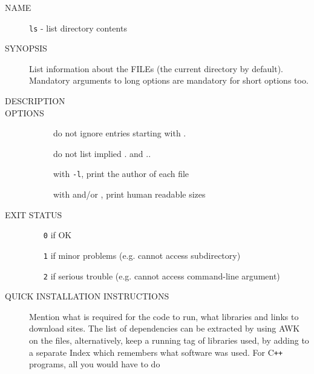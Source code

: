 \vspace{5mm}
\begin{description}
  \item[NAME] {\tt ls} - list directory contents
  \item[SYNOPSIS]  List  information  about the FILEs (the current directory by default).  
                   Mandatory arguments to long options are mandatory for short options too.
  \item[DESCRIPTION] \kant[1]
  \item[OPTIONS]
     \begin{description}
        \item[]
              do not ignore entries starting with .
        \item[]
              do not list implied . and ..
       \item[]
              with {\tt -l}, print the author of each file
       \item[]
              with  and/or , print human readable sizes 
     \end{description}
  \item[EXIT STATUS]
     \begin{itemize}
       \item[\tt{0}] if OK
       \item[\tt{1}] if minor problems (e.g. cannot access subdirectory)
       \item[\tt{2}] if serious trouble (e.g. cannot access command-line argument)
     \end{itemize}    
  \item [QUICK INSTALLATION INSTRUCTIONS] Mention what is required for the code to run, what libraries                                                                                                  
        and links to download sites. The list of dependencies can be extracted                                                                                        
        by using AWK on the files, alternatively, keep a running tag of                                                                                               
        libraries used, by adding to a separate Index which remembers what                                                                                            
        software was used. For C\texttt{++} programs, all you would have to do                                                                                        

\end{description}
